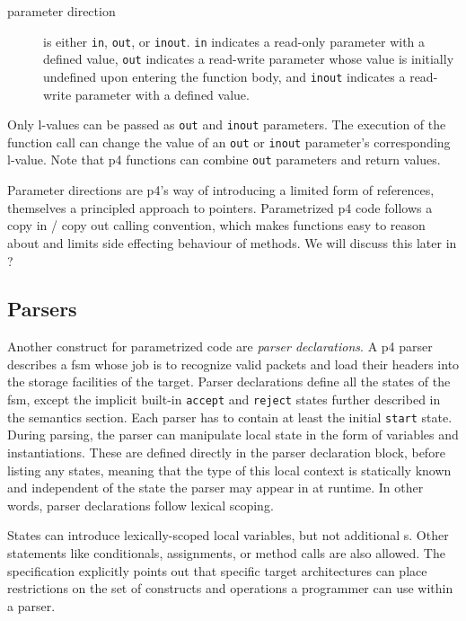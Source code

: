 \begin{description}
	\item[parameter direction] is either \texttt{in}, \texttt{out}, or
	\texttt{inout}. \texttt{in} indicates a read-only parameter with a defined
	value, \texttt{out} indicates a read-write parameter whose value is
	initially undefined upon entering the function body, and \texttt{inout}
	indicates a read-write parameter with a defined value.
\end{description}

Only l-values can be passed as \texttt{out} and \texttt{inout} parameters. The
execution of the function call can change the value of an \texttt{out} or
\texttt{inout} parameter's corresponding l-value. Note that \acrshort{p4}
functions can combine \texttt{out} parameters and return values.

Parameter directions are \acrshort{p4}'s way of introducing a limited form of
references, themselves a principled approach to pointers. Parametrized
\acrshort{p4} code follows a copy in / copy out calling convention, which makes
functions easy to reason about and limits side effecting behaviour of \extern{}
methods. We will discuss this later in ?

\subsection*{Parsers}

Another construct for parametrized code are \emph{parser declarations}. A
\acrshort{p4} parser describes a \acrlong{fsm} whose job is to recognize valid
packets and load their headers into the storage facilities of the target. Parser
declarations define all the states of the \acrshort{fsm}, except the implicit
built-in \texttt{accept} and \texttt{reject} states further described in the
semantics section. Each parser has to contain at least the
initial \texttt{start} state. During parsing, the parser can manipulate local
state in the form of variables and \extern{} instantiations.
These are defined directly in the parser declaration block, before listing any
states, meaning that the type of this local context is statically known and
independent of the state the parser may appear in at runtime. In other words,
parser declarations follow lexical scoping.

States can introduce lexically-scoped local variables, but not additional
\extern{}s. Other statements like conditionals, assignments, or method calls are
also allowed. The specification explicitly points out that specific target
architectures can place restrictions on the set of constructs and operations a
programmer can use within a parser.


